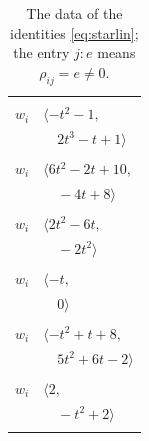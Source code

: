 \documentclass[11pt]{article}
\begin{document}
\begingroup\scriptsize
\setlength{\LTcapwidth}{\textwidth}
\begin{longtable}{@{}ll@{}}
\caption{The data of the identities \eqref{eq:starlin}; the entry $j{:}e$ means $\rho_{ij}=e\neq0$.}\label{tab:star}\\
\hline\endfirsthead\hline\endhead\hline\endfoot
\multicolumn{2}{@{}p{0.97\textwidth}@{}}{$i=0$, $D_i=1$, $\rho_{ij}$: $2{:}1, \allowbreak 6{:}1, \allowbreak 14{:}1, \allowbreak 18{:}2$}\\
$w_i$ & $\langle -t^{2}-1,$\\
 & $\quad 2t^{3}-t+1\rangle$\\
\addlinespace[2pt]
\multicolumn{2}{@{}p{0.97\textwidth}@{}}{$i=1$, $D_i=1$, $\rho_{ij}$: $2{:}2, \allowbreak 4{:}1, \allowbreak 5{:}2, \allowbreak 13{:}1, \allowbreak 18{:}2, \allowbreak 20{:}2$}\\
$w_i$ & $\langle 6t^{2}-2t+10,$\\
 & $\quad -4t+8\rangle$\\
\addlinespace[2pt]
\multicolumn{2}{@{}p{0.97\textwidth}@{}}{$i=2$, $D_i=1$, $\rho_{ij}$: $0{:}2, \allowbreak 1{:}1, \allowbreak 12{:}2, \allowbreak 15{:}2, \allowbreak 19{:}2, \allowbreak 20{:}2$}\\
$w_i$ & $\langle 2t^{2}-6t,$\\
 & $\quad -2t^{2}\rangle$\\
\addlinespace[2pt]
\multicolumn{2}{@{}p{0.97\textwidth}@{}}{$i=3$, $D_i=1$, $\rho_{ij}$: $14{:}2, \allowbreak 18{:}1$}\\
$w_i$ & $\langle -t,$\\
 & $\quad 0\rangle$\\
\addlinespace[2pt]
\multicolumn{2}{@{}p{0.97\textwidth}@{}}{$i=4$, $D_i=1$, $\rho_{ij}$: $1{:}2, \allowbreak 10{:}2, \allowbreak 14{:}2, \allowbreak 16{:}2, \allowbreak 17{:}1, \allowbreak 18{:}2, \allowbreak 19{:}2, \allowbreak 20{:}1$}\\
$w_i$ & $\langle -t^{2}+t+8,$\\
 & $\quad 5t^{2}+6t-2\rangle$\\
\addlinespace[2pt]
\multicolumn{2}{@{}p{0.97\textwidth}@{}}{$i=5$, $D_i=1$, $\rho_{ij}$: $1{:}1, \allowbreak 11{:}2, \allowbreak 15{:}1$}\\
$w_i$ & $\langle 2,$\\
 & $\quad -t^{2}+2\rangle$\\
\addlinespace[2pt]
\multicolumn{2}{@{}p{0.97\textwidth}@{}}{$i=6$, $D_i=1$, $\rho_{ij}$: $0{:}2, \allowbreak 10{:}2, \allowbreak 20{:}2$}\\

\end{longtable}
\end{document}
